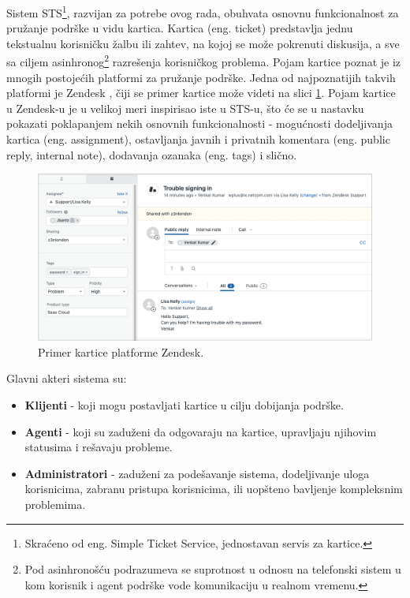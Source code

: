 \documentclass[12pt,oneside]{memoir}
\begin{document}
Sistem STS\footnote{Skraćeno od eng. Simple Ticket Service, jednostavan servis za kartice.}, razvijan za potrebe ovog rada, obuhvata osnovnu funkcionalnost za pružanje podrške u vidu kartica. Kartica (eng. ticket) predstavlja jednu tekstualnu korisničku žalbu ili zahtev, na kojoj se može pokrenuti diskusija, a sve sa ciljem asinhronog\footnote{Pod asinhronošću podrazumeva se suprotnost u odnosu na telefonski sistem u kom korisnik i agent podrške vode komunikaciju u realnom vremenu.} razrešenja korisničkog problema. Pojam kartice poznat je iz mnogih postojećih platformi za pružanje podrške. Jedna od najpoznatijih takvih platformi je Zendesk \cite{zendesk_website}, čiji se primer kartice može videti na slici \ref{fig:zendesk_ticket}. Pojam kartice u Zendesk-u je u velikoj meri inspirisao iste u STS-u, što će se u nastavku pokazati poklapanjem nekih osnovnih funkcionalnosti - mogućnosti dodeljivanja kartica (eng. assignment), ostavljanja javnih i privatnih komentara (eng. public reply, internal note), dodavanja ozanaka (eng. tags) i slično.

\begin{figure}[h]
  \centering
  \includegraphics[width=1\textwidth]{docs/images/ch_1/zendesk_ticket.png} 
  \caption{Primer kartice platforme Zendesk.}
  \label{fig:zendesk_ticket}
\end{figure}

\newpage
Glavni akteri sistema su:

\begin{itemize}
    \item \textbf{Klijenti} - koji mogu postavljati kartice u cilju dobijanja podrške.
    \item \textbf{Agenti} - koji su zaduženi da odgovaraju na kartice, upravljaju njihovim statusima i rešavaju probleme.
    \item \textbf{Administratori} - zaduženi za podešavanje sistema, dodeljivanje uloga korisnicima, zabranu pristupa korisnicima, ili uopšteno bavljenje kompleksnim problemima.
\end{itemize}
\end{document}
